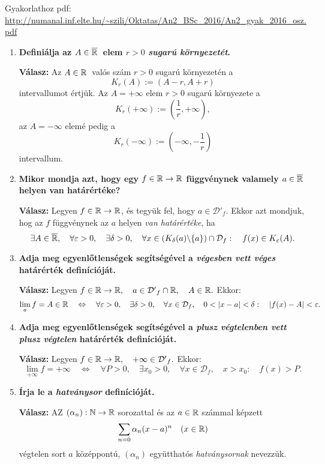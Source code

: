 \documentclass[a4paper,11.5pt]{article}
\begin{document}
	Gyakorlathoz pdf: \url{http://numanal.inf.elte.hu/~szili/Oktatas/An2_BSc_2016/An2_gyak_2016_osz.pdf}
	\begin{enumerate}
		\item \textbf{Definiálja az $A\in\overline{\mathbb{R}}$\ elem $r > 0$ \textit{sugarú környezetét}.}
		
		\textbf{Válasz:} Az $A\in\mathbb{R}$\ valós szám $r>0$ sugarú környezetén a 
		\[ K_r(A):=(A-r,A+r) \]
		intervallumot értjük. Az $A=+\infty$ elem $r>0$ sugarú környezete a
		\[ K_r(+\infty):=\left(\frac{1}{r},+\infty\right), \]
		az $A=-\infty$ elemé pedig a
		\[ K_r(-\infty):=\left(-\infty,-\frac{1}{r}\right) \]
		intervallum.
		
		\item \textbf{Mikor mondja azt, hogy egy $f\in\mathbb{R}\to\mathbb{R}$ függvénynek valamely $a\in\overline{\mathbb{R}}$ helyen van határértéke?}
		
		\textbf{Válasz:} Legyen $f\in\mathbb{R}\to\mathbb{R}$, és tegyük fel, hogy $a\in\mathcal{D'}_f.$ Ekkor azt mondjuk, hog az $f$ függvénynek az $a$ helyen \textit{van határértéke}, ha 
		\[ \exists A\in\overline{\mathbb{R}},\quad \forall\varepsilon>0,\quad \exists\delta>0,\quad \forall x\in (K_\delta(a)\backslash\{a\})\cap\mathcal{D}_f:\quad f(x)\in K_\varepsilon(A). \]
		
		\item \textbf{Adja meg egyenlőtlenségek segítségével a \textit{végesben vett véges} határérték definícióját.}
		
		\textbf{Válasz:} Legyen $f\in\mathbb{R}\to\mathbb{R},\quad  a\in\mathcal{D'}_f\cap\mathbb{R},\quad A\in\mathbb{R}.$ Ekkor:
		\[ \lim_af=A\in\R\quad \Leftrightarrow\quad \forall \varepsilon>0, \quad \exists \delta>0, \quad \forall x\in\mathcal{D}_f,\quad 0<|x-a|<\delta:\quad |f(x)-A|<\varepsilon. \]
		
		\item \textbf{Adja meg egyenlőtlenségek segítségével a \textit{plusz végtelenben vett plusz végtelen}
		határérték definícióját.}
		
		\textbf{Válasz:} Legyen $f\in\mathbb{R}\to\mathbb{R},\quad  +\infty\in\mathcal{D'}_f.$ Ekkor:
		\[ \lim_{+\infty}f=+\infty\quad \Leftrightarrow\quad \forall P>0, \quad \exists x_0>0, \quad \forall x\in\mathcal{D}_f,\quad x>x_0:\quad f(x)>P. \]
		
		\item \textbf{Írja le a \textit{hatványsor} definícióját.}
		
		\textbf{Válasz:} AZ $(\alpha_n):\mathbb{N}\to\mathbb{R}$ sorozattal és az $a\in\mathbb{R}$ számmal képzett
		\[ \sum_{n=0}\alpha_n(x-a)^n\quad (x\in\mathbb{R}) \]
		végtelen sort $a$ középpontú, $(\alpha_n)$ együtthatós \textit{hatványsornak} nevezzük.
		

\end{enumerate}
\end{document}
